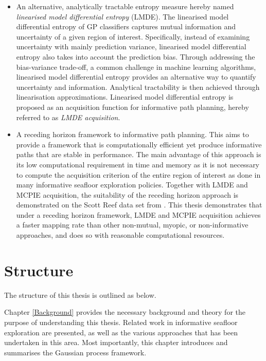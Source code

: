 \begin{itemize}
			\item An alternative, analytically tractable entropy measure hereby named \textit{linearised model differential entropy} (LMDE). The linearised model differential entropy of GP classifiers captures mutual information and uncertainty of a given region of interest. Specifically, instead of examining uncertainty with mainly prediction variance, linearised model differential entropy also takes into account the prediction bias. Through addressing the bias-variance trade-off, a common challenge in machine learning algorithms, linearised model differential entropy provides an alternative way to quantify uncertainty and information. Analytical tractability is then achieved through linearisation approximations. Linearised model differential entropy is proposed as an acquisition function for informative path planning, hereby referred to as \textit{LMDE acquisition}.
			
			\item A receding horizon framework to informative path planning. This aims to provide a framework that is computationally efficient yet produce informative paths that are stable in performance. The main advantage of this approach is its low computational requirement in time and memory as it is not necessary to compute the acquisition criterion of the entire region of interest as done in many informative seafloor exploration policies. Together with LMDE and MCPIE acquisition, the suitability of the receding horizon approach is demonstrated on the Scott Reef data set from \cite{IMOS}. This thesis demonstrates that under a receding horizon framework, LMDE and MCPIE acquisition achieves a faster mapping rate than other non-mutual, myopic, or non-informative approaches, and does so with reasonable computational resources. 
			
		\end{itemize}
			
	\section{Structure}
	
		The structure of this thesis is outlined as below.
		
		Chapter \ref{Background} provides the necessary background and theory for the purpose of understanding this thesis. Related work in informative seafloor exploration are presented, as well as the various approaches that has been undertaken in this area. Most importantly, this chapter introduces and summarises the Gaussian process framework.
		
